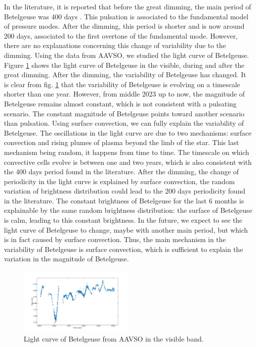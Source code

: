 \documentclass{aa}
\begin{document}
In the literature, it is reported that before the great dimming, the main period of Betelgeuse was 400 days \citep{kiss_variability_2006}. 
This pulsation is associated to the fundamental model of pressure modes. After the dimming, this period is shorter and is now around 200 days, 
associated to the first overtone of the fundamental mode. However, there are no explanations concerning this change of variability due to the dimming.
Using the data from AAVSO, we studied the light curve of Betelgeuse. Figure \ref{light curve Betelgeuse} shows the light curve of Betelgeuse in the visible, 
during and after the great dimming. After the dimming, the variability of Betelgeuse has changed. It is clear from fig. \ref{light curve Betelgeuse} that the 
variability of Betelgeuse is evolving on a timescale shorter than one year. However, from middle 2023 up to now, the magnitude of Betelgeuse remains almost 
constant, which is not consistent with a pulsating scenario. The constant magnitude of Betelgeuse points toward another scenario than pulsation. Using surface 
convection, we can fully explain the variability of Betelgeuse. The oscillations in the light curve are due to two mechanisms: surface convection and rising 
plumes of plasma beyond the limb of the star. This last mechanism being random, it happens from time to time. The timescale on which convective cells evolve
is between one and two years, which is also consistent with the 400 days period found in the literature.  After the dimming, the change of periodicity in the
light curve is explained by surface convection, the random variation of brightness distribution could lead to the 200 days periodicity found in the literature. 
The constant brightness of Betelgeuse for the last 6 months is explainable by the same random brightness distribution: the surface of Betelgeuse is calm, 
leading to this constant brightness. In the future, we expect to see the light curve of Betelgeuse to change, maybe with another main period, but which 
is in fact caused by surface convection. Thus, the main mechanism in the variability of Betelgeuse is surface convection, which is sufficient to explain the 
variation in the magnitude of Betelgeuse.  


\begin{figure}[!h]
    \centering
    \includegraphics[width=0.5\textwidth]{Light_curve_Betelgeuse.png}
    \caption{Light curve of Betelgeuse from AAVSO in the visible band.}
    \label{light curve Betelgeuse}
\end{figure}
\end{document}
